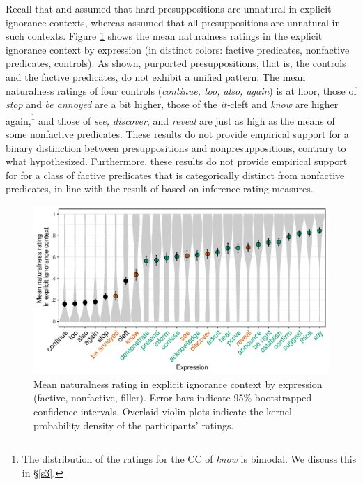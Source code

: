 \documentclass[11pt,fleqn]{article}
\newcommand{\6}{\mbox{$[\hspace*{-.6mm}[$}}
\newcommand{\9}{\mbox{$]\hspace*{-.6mm}]$}}
\begin{document}
Recall that \citealt{simons01} and \citealt{abusch10} assumed that hard presuppositions are unnatural in explicit ignorance contexts, whereas \citealt{mandelkern-etal2020} assumed that all presuppositions are unnatural in such contexts. Figure \ref{fig:acc-by-expression} shows the mean naturalness ratings in the explicit ignorance context by expression (in distinct colors: \color{orange}factive predicates\color{black}, \color{green}nonfactive predicates\color{black},  controls). As shown, purported presuppositions, that is, the controls and the factive predicates, do not exhibit a unified pattern: The mean naturalness ratings of four controls ({\em continue, too, also, again}) is at floor, those of {\em stop} and {\em be annoyed} are a bit higher, those of the {\em it-}cleft and {\em know} are higher again,\footnote{The distribution of the ratings for the CC of {\em know} is bimodal. We discuss this in \S\ref{s3}.} and those of {\em see, discover}, and {\em reveal} are just as high as the means of some nonfactive predicates. These results do not provide empirical support for a binary distinction between presuppositions and nonpresuppositions, contrary to what \citealt{mandelkern-etal2020} hypothesized. Furthermore, these results do not provide empirical support for for a class of factive predicates that is categorically distinct from nonfactive predicates, in line with the result of \citealt{degen-tonhauser-language} based on inference rating measures. 

\begin{figure}[h!]
\centering
\includegraphics[width=1\textwidth]{../../results/main/13explicitIgnorance/graphs/explicit-ignorance-naturalness-by-predicate}
\caption{Mean naturalness rating in explicit ignorance context by expression (\color{orange}factive\color{black}, \color{green}nonfactive\color{green}, \color{black}filler\color{black}). Error bars indicate 95\% bootstrapped confidence intervals. Overlaid violin plots indicate the kernel probability density of the participants' ratings.}\label{fig:acc-by-expression}
\end{figure}
\end{document}
